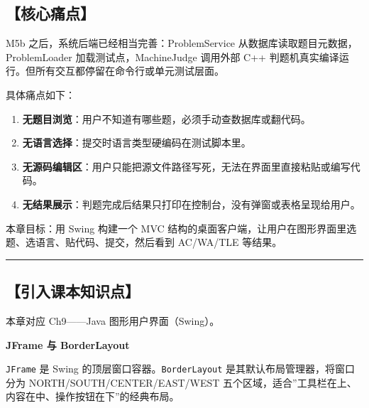\documentclass[
  11pt,
]{ctexart}
\providecommand{\tightlist}{%
  \setlength{\itemsep}{0pt}\setlength{\parskip}{0pt}}
\begin{document}
\hypertarget{ux6838ux5fc3ux75dbux70b9-3}{%
\subsection{【核心痛点】}\label{ux6838ux5fc3ux75dbux70b9-3}}

M5b 之后，系统后端已经相当完善：ProblemService
从数据库读取题目元数据，ProblemLoader 加载测试点，MachineJudge 调用外部
C++ 判题机真实编译运行。但所有交互都停留在命令行或单元测试层面。

具体痛点如下：

\begin{enumerate}
\def\labelenumi{\arabic{enumi}.}
\tightlist
\item
  \textbf{无题目浏览}：用户不知道有哪些题，必须手动查数据库或翻代码。
\item
  \textbf{无语言选择}：提交时语言类型硬编码在测试脚本里。
\item
  \textbf{无源码编辑区}：用户只能把源文件路径写死，无法在界面里直接粘贴或编写代码。
\item
  \textbf{无结果展示}：判题完成后结果只打印在控制台，没有弹窗或表格呈现给用户。
\end{enumerate}

本章目标：用 Swing 构建一个 MVC
结构的桌面客户端，让用户在图形界面里选题、选语言、贴代码、提交，然后看到
AC/WA/TLE 等结果。

\begin{center}\rule{0.5\linewidth}{0.5pt}\end{center}

\hypertarget{ux5f15ux5165ux8bfeux672cux77e5ux8bc6ux70b9-3}{%
\subsection{【引入课本知识点】}\label{ux5f15ux5165ux8bfeux672cux77e5ux8bc6ux70b9-3}}

本章对应 Ch9------Java 图形用户界面（Swing）。

\textbf{JFrame 与 BorderLayout}

\texttt{JFrame} 是 Swing 的顶层窗口容器。\texttt{BorderLayout}
是其默认布局管理器，将窗口分为 NORTH/SOUTH/CENTER/EAST/WEST
五个区域，适合''工具栏在上、内容在中、操作按钮在下''的经典布局。
\end{document}
